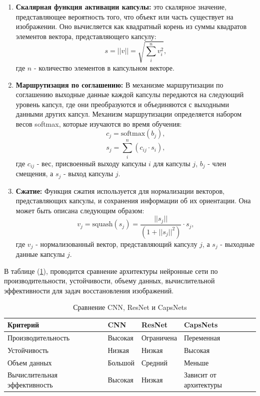 \begin{enumerate}
	\item \textbf{Скалярная функция активации капсулы:} это скалярное значение, представляющее вероятность того, что объект или часть существует на изображении. Оно вычисляется как квадратный корень из суммы квадратов элементов вектора, представляющего капсулу:
		\begin{equation}
			s = ||v|| = \sqrt{\sum_{i}^{n} v_{i}^{2}},
		\end{equation}
		где \(n\) - количество элементов в капсульном векторе.

	\item \textbf{Маршрутизация по соглашению:} В механизме маршрутизации по соглашению выходные данные каждой капсулы передаются на следующий уровень капсул, где они преобразуются и объединяются с выходными данными других капсул. Механизм маршрутизации определяется набором весов softmax, которые изучаются во время обучения:
		\begin{equation}
			c_{j} = \text{softmax}(b_{j}),
		\end{equation}
		\begin{equation}
			s_{j} = \sum_{i}^{n}(c_{ij} \cdot s_{i}),
		\end{equation}
   		где \(c_{ij}\) - вес, присвоенный выходу капсулы \(i\) для капсулы \(j\), \(b_{j}\) - член смещения, а \(s_{j}\) - выход капсулы \(j\).

	\item \textbf{Сжатие:} Функция сжатия используется для нормализации векторов, представляющих капсулы, и сохранения информации об их ориентации. Она может быть описана следующим образом:
		\begin{equation}
			v_{j} = \text{squash}(s_{j}) = \frac{||s_{j}||}{(1 + ||s_{j}||^{2})} \cdot s_{j},
		\end{equation}
   		где \(v_{j}\) - нормализованный вектор, представляющий капсулу \(j\), а \(s_{j}\) - выходные данные капсулы \(j\).
\end{enumerate}

В таблице (\ref{tab:comparison}), проводится сравнение архитектуры нейронные сети по производительности, устойчивости, объему данных, вычислительной эффективности для задач восстановления изображений. 

\begin{table}[H]
    \centering
    \caption{Сравнение CNN, ResNet и CapsNets}
    \label{tab:comparison}
    \begin{tabular}{|p{5cm}|p{3cm}|p{3cm}|p{3cm}|}
        \hline
        \textbf{Критерий} & \textbf{CNN} & \textbf{ResNet} & \textbf{CapsNets} \\ \hline
        Производительность & Высокая & Ограничена & Переменная \\ \hline
        Устойчивость & Низкая & Низкая & Высокая \\ \hline
        Объем данных & Большой & Средний & Меньше \\ \hline
        Вычислительная эффективность & Высокая & Низкая & Зависит от архитектуры \\ \hline
    \end{tabular}
\end{table}



